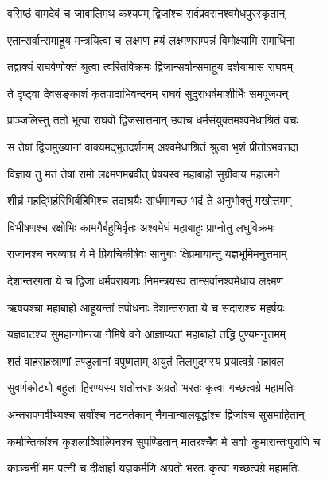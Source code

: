 \twolineshloka
{वसिष्ठं वामदेवं च जाबालिमथ कश्यपम्}
{द्विजांश्च सर्वप्रवरानश्वमेधपुरस्कृतान्} %

\twolineshloka
{एतान्सर्वान्समाहूय मन्त्रयित्वा च लक्ष्मण}
{हयं लक्ष्मणसम्पन्नं विमोक्ष्यामि समाधिना} %

\twolineshloka
{तद्वाक्यं राघवेणोक्तं श्रुत्वा त्वरितविक्रमः}
{द्विजान्सर्वान्समाहूय दर्शयामास राघवम्} %

\twolineshloka
{ते दृष्ट्वा देवसङ्काशं कृतपादाभिवन्दनम्}
{राघवं सुदुराधर्षमाशीर्भिः समपूजयन्} %

\twolineshloka
{प्राञ्जलिस्तु ततो भूत्वा राघवो द्विजसात्तमान्}
{उवाच धर्मसंयुक्तमश्वमेधाश्रितं वचः} %

\twolineshloka
{स तेषां द्विजमुख्यानां वाक्यमद्भुतदर्शनम्}
{अश्वमेधाश्रितं श्रुत्वा भृशं प्रीतोऽभवत्तदा} %

\twolineshloka
{विज्ञाय तु मतं तेषां रामो लक्ष्मणमब्रवीत्}
{प्रेषयस्व महाबाहो सुग्रीवाय महात्मने} %

\twolineshloka
{शीघ्रं महद्भिर्हरिभिर्बहिभिश्च तदाश्रयैः}
{सार्धमागच्छ भद्रं ते अनुभोक्तुं मखोत्तमम्} %

\twolineshloka
{विभीषणश्च रक्षोभिः कामगैर्बहुभिर्वृतः}
{अश्वमेधं महाबाहुः प्राप्नोतु लघुविक्रमः} %

\twolineshloka
{राजानश्च नरव्याघ्र ये मे प्रियचिकीर्षवः}
{सानुगाः क्षिप्रमायान्तु यज्ञभूमिमनुत्तमाम्} %

\twolineshloka
{देशान्तरगता ये च द्विजा धर्मपरायणाः}
{निमन्त्रयस्व तान्सर्वानश्वमेधाय लक्ष्मण} %

\twolineshloka
{ऋषयश्चा महाबाहो आहूयन्तां तपोधनाः}
{देशान्तरगता ये च सदाराश्च महर्षयः} %

\twolineshloka
{यज्ञवाटश्च सुमहान्गोमत्या नैमिषे वने}
{आज्ञाप्यतां महाबाहो तद्धि पुण्यमनुत्तमम्} %

\twolineshloka
{शतं वाहसहस्राणां तण्डुलानां वपुष्मताम्}
{अयुतं तिलमुद्गस्य प्रयात्वग्रे महाबल} %

\twolineshloka
{सुवर्णकोट्यो बहुला हिरण्यस्य शतोत्तराः}
{अग्रतो भरतः कृत्वा गच्छत्वग्रे महामतिः} %

\twolineshloka
{अन्तरापणवीथ्यश्च सर्वांश्च नटनर्तकान्}
{नैगमान्बालवृद्धांश्च द्विजांश्च सुसमाहितान्} %

\twolineshloka
{कर्मान्तिकांश्च कुशलाञ्शिल्पिनश्च सुपण्डितान्}
{मातरश्चैव मे सर्वाः कुमारान्तःपुराणि च} %

\twolineshloka
{काञ्चनीं मम पत्नीं च दीक्षार्हां यज्ञकर्मणि}
{अग्रतो भरतः कृत्वा गच्छत्वग्रे महामतिः} %


